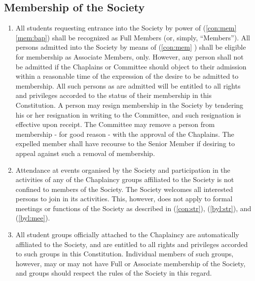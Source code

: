 \documentclass[11pt]{article}
\begin{document}
\subsection{Membership of the Society}
\begin{enumerate}
\item All students requesting entrance into the Society by power of  (\cref{con:mem} \cref{mem:bap}) shall be recognized as Full Members (or, simply, ``Members''). All persons admitted into the Society by means of  (\cref{con:mem} ) shall be eligible for membership as Associate Members, only. However, any person shall not be admitted if the Chaplains or Committee should object to their admission within a reasonable time of the expression of the desire to be admitted to membership. All such persons as are admitted will be entitled to all rights and privileges accorded to the status of their membership in this Constitution. A person may resign membership in the Society by tendering his or her resignation in writing to the Committee, and such resignation is effective upon receipt.  The Committee may remove a person from membership - for good reason - with the approval of the Chaplains. The expelled member shall have recourse to the Senior Member if desiring to appeal against such a removal of membership.
\item Attendance at events organised by the Society and participation in the activities of any of the Chaplaincy groups affiliated to the Society is not confined to members of the Society. The Society welcomes all interested persons to join in its activities. This, however, does not apply to formal meetings or functions of the Society as described in  (\cref{con:str}),  (\cref{byl:str}), and  (\cref{byl:mee}).
\item All student groups officially attached to the Chaplaincy are automatically affiliated to the Society, and are entitled to all rights and privileges accorded to such groups in this Constitution. Individual members of such groups, however, may or may not have Full or Associate membership of the Society, and groups should respect the rules of the Society in this regard.
\end{enumerate}
\end{document}
